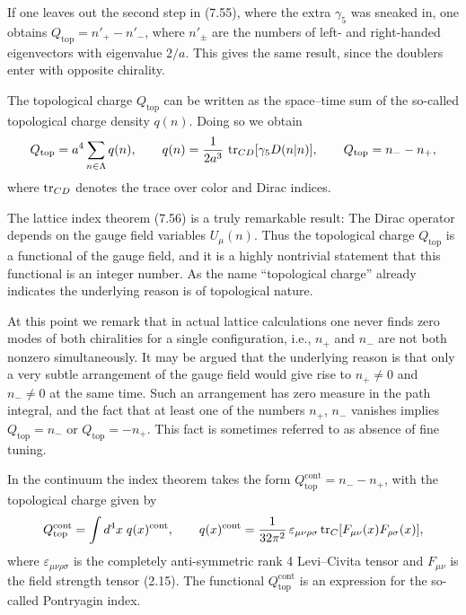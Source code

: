 If one leaves out the second step in (7.55), where the extra $\gamma_5$ was
sneaked in, one obtains $Q_{\mathrm{top}} = n'_+ - n'_-$, where $n'_\pm$ are
the numbers of left- and right-handed eigenvectors with eigenvalue $2/a$. This
gives the same result, since the doublers enter with opposite chirality.

The topological charge $Q_{\mathrm{top}}$ can be written as the space--time
sum of the so-called topological charge density $q(n)$. Doing so we obtain
\begin{equation}
  Q_{\mathrm{top}} = a^4\sum_{n\in\Lambda} q(n), \qquad
  q(n) = \frac{1}{2a^3}\,\operatorname{tr}_{CD}[\gamma_5 D(n|n)], \qquad
  Q_{\mathrm{top}} = n_- - n_+,
\end{equation}
where $\operatorname{tr}_{CD}$ denotes the trace over color and Dirac indices.

The lattice index theorem (7.56) is a truly remarkable result: The Dirac
operator depends on the gauge field variables $U_\mu(n)$. Thus the topological
charge $Q_{\mathrm{top}}$ is a functional of the gauge field, and it is a
highly nontrivial statement that this functional is an integer number. As the
name ``topological charge'' already indicates the underlying reason is of
topological nature.

At this point we remark that in actual lattice calculations one never finds
zero modes of both chiralities for a single configuration, i.e., $n_+$ and
$n_-$ are not both nonzero simultaneously. It may be argued that the
underlying reason is that only a very subtle arrangement of the gauge field
would give rise to $n_+ \neq 0$ and $n_- \neq 0$ at the same time. Such an
arrangement has zero measure in the path integral, and the fact that at least
one of the numbers $n_+$, $n_-$ vanishes implies $Q_{\mathrm{top}} = n_-$ or
$Q_{\mathrm{top}} = -n_+$. This fact is sometimes referred to as absence of
fine tuning.

In the continuum the index theorem takes the form
$Q^{\mathrm{cont}}_{\mathrm{top}} = n_- - n_+$, with the topological charge
given by
\begin{equation}
  Q^{\mathrm{cont}}_{\mathrm{top}} = \int d^4x\;q(x)^{\mathrm{cont}}, \qquad
  q(x)^{\mathrm{cont}} = \frac{1}{32\pi^2}\,\varepsilon_{\mu\nu\rho\sigma}
  \operatorname{tr}_C[F_{\mu\nu}(x)F_{\rho\sigma}(x)],
\end{equation}
where $\varepsilon_{\mu\nu\rho\sigma}$ is the completely anti-symmetric rank 4
Levi--Civita tensor and $F_{\mu\nu}$ is the field strength tensor (2.15). The
functional $Q^{\mathrm{cont}}_{\mathrm{top}}$ is an expression for the
so-called Pontryagin index.

